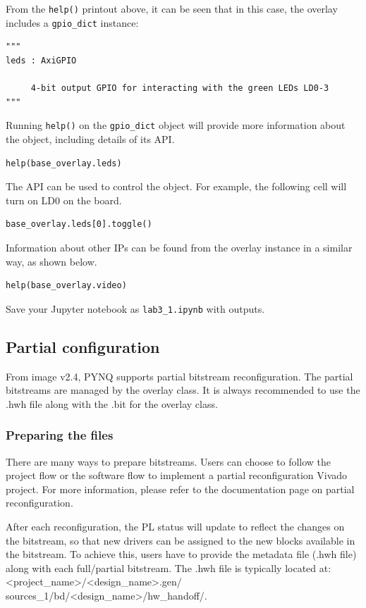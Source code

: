 \documentclass[a4paper,12pt,twoside]{article}
\begin{document}
From the \texttt{help()} printout above, it can be seen that in this case, the overlay includes a \texttt{gpio\_dict} instance:
\begin{verbatim}
"""
leds : AxiGPIO

     4-bit output GPIO for interacting with the green LEDs LD0-3
"""
\end{verbatim}
Running \texttt{help()} on the \texttt{gpio\_dict} object will provide more information about the object, including details of its API.
\begin{verbatim}
help(base_overlay.leds)
\end{verbatim}
The API can be used to control the object. For example, the following cell will turn on LD0 on the board.
\begin{verbatim}
base_overlay.leds[0].toggle()
\end{verbatim}
Information about other IPs can be found from the overlay instance in a similar way, as shown below.
\begin{verbatim}
help(base_overlay.video)
\end{verbatim}
Save your Jupyter notebook as \texttt{lab3\_1.ipynb} with outputs.
\subsection{Partial configuration}\label{S52}
From image v2.4, PYNQ supports partial bitstream reconfiguration. The partial bitstreams are managed by the overlay class. It is always recommended to use the .hwh file along with the .bit for the overlay class.

\subsubsection{Preparing the files}
There are many ways to prepare bitstreams. Users can choose to follow the project flow or the software flow to implement a partial reconfiguration Vivado project. For more information, please refer to the documentation page on partial reconfiguration.

After each reconfiguration, the PL status will update to reflect the changes on the bitstream, so that new drivers can be assigned to the new blocks available in the bitstream. To achieve this, users have to provide the metadata file (.hwh file) along with each full/partial bitstream. The .hwh file is typically located at: <project\_name>/<design\_name>.gen/\\
sources\_1/bd/<design\_name>/hw\_handoff/.
\end{document}
